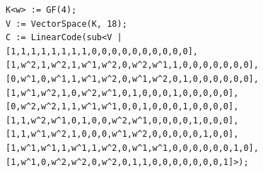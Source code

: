 \begin{verbatim}
K<w> := GF(4);
V := VectorSpace(K, 18);
C := LinearCode(sub<V |
[1,1,1,1,1,1,1,1,0,0,0,0,0,0,0,0,0,0],
[1,w^2,1,w^2,1,w^1,w^2,0,w^2,w^1,1,0,0,0,0,0,0,0],
[0,w^1,0,w^1,1,w^1,w^2,0,w^1,w^2,0,1,0,0,0,0,0,0],
[1,w^1,w^2,1,0,w^2,w^1,0,1,0,0,0,1,0,0,0,0,0],
[0,w^2,w^2,1,1,w^1,w^1,0,0,1,0,0,0,1,0,0,0,0],
[1,1,w^2,w^1,0,1,0,0,w^2,w^1,0,0,0,0,1,0,0,0],
[1,1,w^1,w^2,1,0,0,0,w^1,w^2,0,0,0,0,0,1,0,0],
[1,w^1,w^1,1,w^1,1,w^2,0,w^1,w^1,0,0,0,0,0,0,1,0],
[1,w^1,0,w^2,w^2,0,w^2,0,1,1,0,0,0,0,0,0,0,1]>);
\end{verbatim}
